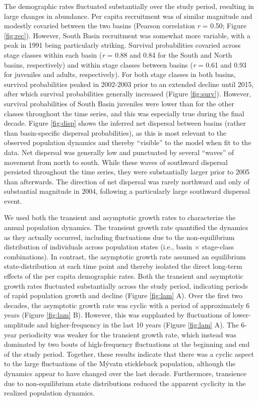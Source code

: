 \documentclass[11pt]{article}
\begin{document}
The demographic rates fluctuated substantially over the study period,
resulting in large changes in abundance. 
Per capita recruitment was of similar magnitude and modestly covaried between the two basins
(Pearson correlation \textit{r} = 0.50; Figure \ref{fig:rec}).
However, South Basin recruitment was somewhat more variable,
with a peak in 1991 being particularly striking.
Survival probabilities covaried across stage classes within each basin
(\textit{r} = 0.88 and 0.84 for the South and North basins, respectively)
and within stage classes between basins 
(\textit{r} = 0.61 and 0.93 for juveniles and adults, respectively).
For both stage classes in both basins, 
survival probabilities peaked in 2002-2003 
prior to an extended decline until 2015,
after which survival probabilities generally increased (Figure \ref{fig:surv}).
However, survival probabilities of South Basin juveniles were lower 
than for the other classes throughout the time series, 
and this was especially true during the final decade.
Figure \ref{fig:disp} shows the inferred net dispersal between basins 
(rather than basin-specific dispersal probabilities),
as this is most relevant to the observed population dynamics
and thereby ``visible'' to the model when fit to the data.
Net dispersal was generally low and punctuated by several ``waves'' of movement from 
north to south. 
While these waves of southward dispersal persisted throughout the time series,
they were substantially larger prior to 2005 than afterwards.
The direction of net dispersal was rarely northward and only of substantial magnitude in 2004,
following a particularly large southward dispersal event.

We used both the transient and asymptotic growth rates 
to characterize the annual population dynamics.
The transient growth rate quantified the dynamics as they actually occurred,
including fluctuations due to the non-equilibrium distribution of individuals across 
population states (i.e., basin $\times$ stage-class combinations).
In contrast, the asymptotic growth rate assumed an equilibrium state-distribution 
at each time point and thereby isolated the direct long-term effects 
of the per capita demographic rates.
Both the transient and asymptotic growth rates fluctuated substantially 
across the study period, 
indicating periods of rapid population growth and decline (Figure \ref{fig:lam} A).
Over the first two decades, 
the asymptotic growth rate was cyclic with a period of approximately 6 years
(Figure \ref{fig:lam} B).
However, this was supplanted by fluctuations of lower-amplitude and higher-frequency  
in the last 10 years (Figure \ref{fig:lam} A).
The 6-year periodicity was weaker for the transient growth rate,
which instead was dominated by two bouts of high-frequency fluctuations
at the beginning and end of the study period.
Together, these results indicate that there was a cyclic aspect to the large fluctuations 
of the M\'{y}vatn stickleback population, 
although the dynamics appear to have changed over the last decade.
Furthermore, transience due to non-equilibrium state distributions
reduced the apparent cyclicity in the realized population dynamics.
\end{document}
